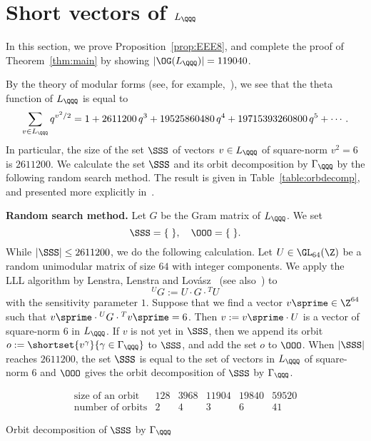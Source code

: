 \documentclass{amsart}
\begin{document}
\section{Short vectors of $L_{\QQQ}$}\label{sec:short} 
%
In this section,
we prove Proposition~\ref{prop:EEE8}, 
and complete the proof of Theorem~\ref{thm:main}
by showing  $|\OG(L_{\QQQ})|=119040$.
\par
\medskip
By the theory of modular forms (see, for example,~\cite[Chapter 7]{SerreBook}),
we see that the theta function of $L_{\QQQ}$ is equal to 
$$
\sum_{v\in L_{\QQQ}} q^{v^2/2}=1+2611200 \,q^3+ 19525860480 \,q^4+ 19715393260800 \,q^5 +\cdots.
$$
In particular, 
the size of the set $\SSS$ of vectors $v\in L_{\QQQ}$ of square-norm $v^2=6$
is $2611200$.
We  calculate  the set $\SSS$ and its orbit decomposition by $\Gamma_{\QQQ}$  
by the following random search method.
The result is given in Table~\ref{table:orbdecomp},
and presented more explicitly in~\cite{compdata}.
\par\medskip
{\bf Random search method.}
Let $G$ be the Gram matrix of $L_{\QQQ}$.
We set 
$$
\SSS=\{\;\}, \quad \OOO=\{\;\}.
$$
While $|\SSS|\le 2611200$,
we do the following calculation.
Let $U\in \GL_{64} (\Z)$ be a random unimodular matrix of size $64$  with integer components.
We apply the LLL  algorithm by Lenstra, Lenstra and Lov\'{a}sz~\cite{LLL} (see also~\cite[Chapter 2]{CohBook})
to 
$$
{}^U G:=U\cdot G\cdot {}^T U
$$
with the sensitivity parameter $1$.
Suppose that  we find a vector $v\sprime\in \Z^{64}$ such that $v\sprime \cdot {}^U G\cdot {}^T v\sprime =6$.
Then $v:=v\sprime \cdot U$ is a vector of square-norm $6$ in $L_{\QQQ}$.
If $v$ is not yet in $\SSS$, then we append its orbit
$o:=\shortset{v^{\gamma}}{\gamma\in \Gamma_{\QQQ}}$ to $\SSS$,
and add the set $o$ to $\OOO$.
When $|\SSS|$ reaches $2611200$,
the set $\SSS$  is equal to the set of vectors in $L_{\QQQ}$ of square-norm $6$
and $\OOO$ gives the orbit decomposition of $\SSS$ by  $\Gamma_{\QQQ}$.
\par
\medskip
%
\begin{table}
$$
\begin{array}{c|ccccc}
\textrm{size of an orbit} & 128  & 3968 & 11904 & 19840 & 59520 \\
\hline 
\textrm{number of orbits} & 2 & 4 & 3 & 6 & 41
\end{array}
$$
\vskip 10pt 
\caption{Orbit decomposition of $\SSS$ by $\Gamma_{\QQQ}$}
\label{table:orbdecomp}
\end{table}
\end{document}
